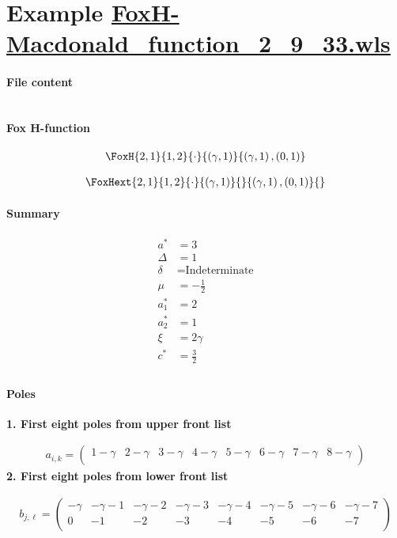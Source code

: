 \documentclass[11pt]{article}
\begin{document}
\section{Example \url{FoxH-Macdonald_function_2_9_33.wls}}

\paragraph{File content}

\inputminted{text}{FoxH-Macdonald_function_2_9_33.wls}

\paragraph{Fox H-function}

\begin{align*}
  \FoxH
    {2,1}
    {1,2}
    {\cdot}
    {\left(\gamma, 1\right)}
    {\left(\gamma, 1\right), \left(0, 1\right)}
\end{align*}

\begin{align*}
  \FoxHext
    {2,1}
    {1,2}
    {\cdot}
    {\left(\gamma, 1\right)}
    {}
    {\left(\gamma, 1\right), \left(0, 1\right)}
    {}
\end{align*}

\paragraph{Summary}

\begin{align*}
  a^*    & = 3 \\
  \Delta & = 1 \\
  \delta & = \text{Indeterminate} \\
  \mu    & = -\frac{1}{2} \\
  a_1^*  & = 2 \\
  a_2^*  & = 1 \\
  \xi    & = 2 \gamma \\
  c^*    & = \frac{3}{2} \\
\end{align*}

\paragraph{Poles}

\noindent\textbf{1. First eight poles from upper front list}

\begin{align*}
  a_{i,k} = 
  \left(
\begin{array}{cccccccc}
 1-\gamma  & 2-\gamma  & 3-\gamma  & 4-\gamma  & 5-\gamma  & 6-\gamma  & 7-\gamma  & 8-\gamma  \\
\end{array}
\right)
\end{align*}
\noindent\textbf{2. First eight poles from lower front list}

\begin{align*}
  b_{j,\ell} = 
  \left(
\begin{array}{cccccccc}
 -\gamma  & -\gamma -1 & -\gamma -2 & -\gamma -3 & -\gamma -4 & -\gamma -5 & -\gamma -6 & -\gamma -7 \\
 0 & -1 & -2 & -3 & -4 & -5 & -6 & -7 \\
\end{array}
\right)
\end{align*}

\printbibliography[title={References}]
\end{document}
